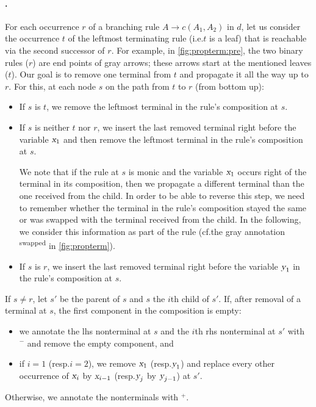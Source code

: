 \documentclass[../../document.tex]{subfiles}
\begin{document}
    \paragraph{.}
    For each occurrence \(r\) of a branching rule $A \to c(A_1, A_2)$ in \(d\), let us consider the occurrence \(t\) of the leftmost terminating rule (i.e.\@ \(t\) is a leaf) that is reachable via the second successor of \(r\).
    For example, in \cref{fig:propterm:pre}, the two binary rules (\(r\)) are end points of gray arrows; these arrows start at the mentioned leaves (\(t\)).
    Our goal is to remove one terminal from $t$ and propagate it all the way up to $r$.
    For this, at each node \(s\) on the path from \(t\) to \(r\) (from bottom up):
    \begin{itemize}[nosep]
        \item If \(s\) is \(t\), we remove the leftmost terminal in the rule's composition at \(s\).
        \item
        If \(s\) is neither \(t\) nor \(r\), we insert the last removed terminal right before the variable \(\textsl{x}_1\) and then remove the leftmost terminal in the rule's composition at \(s\).

        We note that if the rule at $s$ is monic and the variable $\textsl{x}_1$ occurs right of the terminal in its composition, then we propagate a different terminal than the one received from the child.
        In order to be able to reverse this step, we need to remember whether the terminal in the rule's composition stayed the same or was swapped with the terminal received from the child.
        In the following, we consider this information as part of the rule (cf.\@ the gray annotation \textsuperscript{swapped} in \cref{fig:propterm}).
        \item If \(s\) is \(r\), we insert the last removed terminal right before the variable \(\textsl{y}_1\) in the rule's composition at \(s\).
    \end{itemize}
    If \(s \neq r\), let \(s'\) be the parent of $s$ and $s$ the \(i\)th child of $s'$.
    If, after removal of a terminal at \(s\), the first component in the composition is empty:
    \begin{itemize}[noitemsep,topsep=1pt]
        \item we annotate the lhs nonterminal at \(s\) and the \(i\)th rhs nonterminal at \(s'\) with $^-$ and remove the empty component, and
        \item if \(i = 1\) (resp.\@ \(i = 2\)), we remove \(\textsl{x}_1\) (resp.\@ \(\textsl{y}_1\)) and replace every other occurrence of \(\textsl{x}_i\) by \(\textsl{x}_{i-1}\) (resp.\@ \(\textsl{y}_j\) by \(\textsl{y}_{j-1}\)) at $s'$.
    \end{itemize}
    Otherwise, we annotate the nonterminals with \(^+\).
\end{document}
